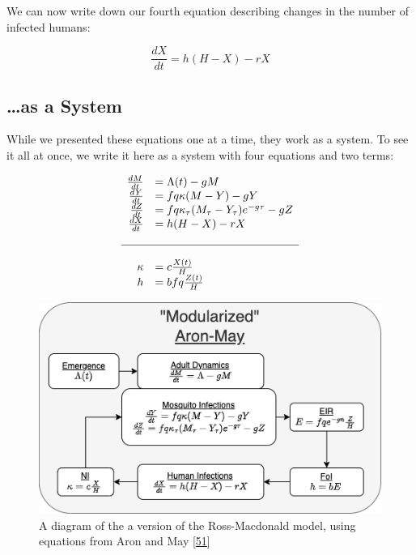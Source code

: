 \documentclass[
]{book}
\begin{document}
We can now write down our fourth equation describing changes in the number of infected humans:

\begin{equation}
\frac{dX}{dt} = h (H-X) - r X 
\end{equation}

\hypertarget{as-a-system}{%
\subsection{\ldots as a System}\label{as-a-system}}

While we presented these equations one at a time, they work as a system. To see it all at once, we write it here as a system with four equations and two terms:

\begin{equation}
\begin{array}{rl}
\frac{dM}{dt} &= \Lambda(t) - g M \\
\frac{dY}{dt} &= fq\kappa(M-Y) - g Y \\
\frac{dZ}{dt} &= fq\kappa_\tau(M_\tau-Y_\tau)e^{-g\tau} - g Z \\
\frac{dX}{dt} &= h (H-X) - rX  \\ \\ \hline \\ 
\kappa &= c \frac{X(t)}{H} \\
h &= b fq \frac{Z(t)}{H} \\
\end{array}
\end{equation}

\begin{figure}
\centering
\includegraphics{Figures/AronMay.png}
\caption{A diagram of the a version of the Ross-Macdonald model, using equations from Aron and May {[}\protect\hyperlink{ref-AronJL1982PopulationDynamics}{51}{]}}
\end{figure}
\end{document}
